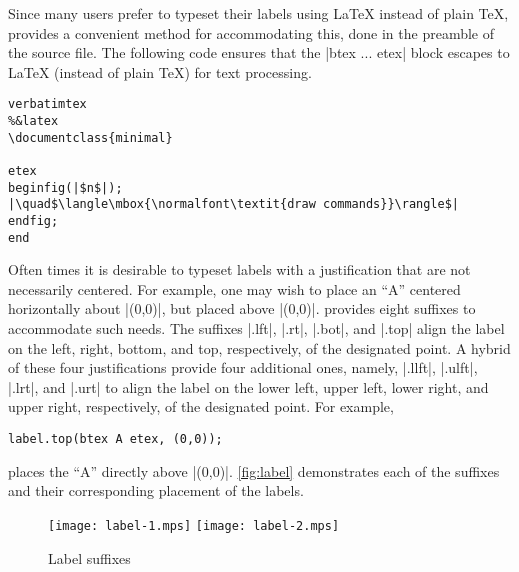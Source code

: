 Since many \MP{} users prefer to typeset their labels using \LaTeX{}
instead of plain \TeX, \MP{} provides a convenient method for
accommodating this, done in the preamble of the \MP{} source file.  The
following code ensures that the |btex ... etex| block escapes to
\LaTeX{} (instead of plain \TeX) for text processing.

\begin{lstlisting}[style=MP]
verbatimtex
%&latex
\documentclass{minimal}

etex
beginfig(|$n$|);
|\quad$\langle\mbox{\normalfont\textit{draw commands}}\rangle$|
endfig;
end
\end{lstlisting}

Often times it is desirable to typeset labels with a justification that
are not necessarily centered.  For example, one may wish to place an
``A'' centered horizontally about |(0,0)|, but placed above
|(0,0)|. \MP{} provides eight suffixes to accommodate such needs.  The
suffixes |.lft|, |.rt|, |.bot|, and |.top| align the label on the left,
right, bottom, and top, respectively, of the designated point.  A hybrid
of these four justifications provide four additional ones, namely,
|.llft|, |.ulft|, |.lrt|, and |.urt| to align the label on the lower
left, upper left, lower right, and upper right, respectively, of the
designated point.  For example,

\begin{lstlisting}[style=MP]
label.top(btex A etex, (0,0));
\end{lstlisting}
places the ``A'' directly above |(0,0)|.  \autoref{fig:label}
demonstrates each of the suffixes and their corresponding placement of
the labels.

\begin{figure}
  \hfill%
  \texttt{[image: label-1.mps]}
  \hfill%
  \texttt{[image: label-2.mps]}
  \hfill\mbox{}
  \caption{Label suffixes}
  \label{fig:label}
\end{figure}
